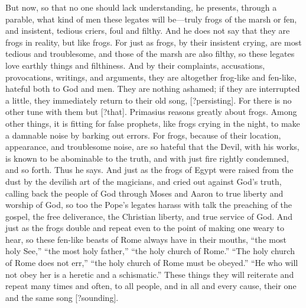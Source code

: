 But now, so that no one should lack understanding, he presents, through a parable, what kind of men these legates will be—truly frogs of the marsh or fen, and insistent, tedious criers, foul and filthy. And he does not say that they are frogs in reality, but like frogs. For just as frogs, by their insistent crying, are most tedious and troublesome, and those of the marsh are also filthy, so these legates love earthly things and filthiness. And by their complaints, accusations, provocations, writings, and arguments, they are altogether frog-like and fen-like, hateful both to God and men. They are nothing ashamed; if they are interrupted a little, they immediately return to their old song, [?persisting]. For there is no other tune with them but [?that]. Primasius reasons greatly about frogs. Among other things, it is fitting for false prophets, like frogs crying in the night, to make a damnable noise by barking out errors. For frogs, because of their location, appearance, and troublesome noise, are so hateful that the Devil, with his works, is known to be abominable to the truth, and with just fire rightly condemned, and so forth. Thus he says. And just as the frogs of Egypt were raised from the dust by the devilish art of the magicians, and cried out against God’s truth, calling back the people of God through Moses and Aaron to true liberty and worship of God, so too the Pope’s legates harass with talk the preaching of the gospel, the free deliverance, the Christian liberty, and true service of God. And just as the frogs double and repeat even to the point of making one weary to hear, so these fen-like beasts of Rome always have in their mouths, “the most holy See,” “the most holy father,” “the holy church of Rome.” “The holy church of Rome does not err,” “the holy church of Rome must be obeyed.” “He who will not obey her is a heretic and a schismatic.” These things they will reiterate and repeat many times and often, to all people, and in all and every cause, their one and the same song [?sounding].

